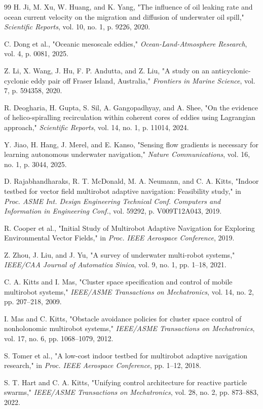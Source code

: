 \documentclass[lettersize,journal]{IEEEtran}
\begin{document}
\begin{thebibliography}{99}
 H. Ji, M. Xu, W. Huang, and K. Yang, "The influence of oil leaking rate and ocean current velocity on the migration and diffusion of underwater oil spill," \textit{Scientific Reports}, vol. 10, no. 1, p. 9226, 2020.

 C. Dong et al., "Oceanic mesoscale eddies," \textit{Ocean-Land-Atmosphere Research}, vol. 4, p. 0081, 2025.

 Z. Li, X. Wang, J. Hu, F. P. Andutta, and Z. Liu, "A study on an anticyclonic-cyclonic eddy pair off Fraser Island, Australia," \textit{Frontiers in Marine Science}, vol. 7, p. 594358, 2020.

 R. Deogharia, H. Gupta, S. Sil, A. Gangopadhyay, and A. Shee, "On the evidence of helico-spiralling recirculation within coherent cores of eddies using Lagrangian approach," \textit{Scientific Reports}, vol. 14, no. 1, p. 11014, 2024.

 Y. Jiao, H. Hang, J. Merel, and E. Kanso, "Sensing flow gradients is necessary for learning autonomous underwater navigation," \textit{Nature Communications}, vol. 16, no. 1, p. 3044, 2025.

 D. Rajabhandharaks, R. T. McDonald, M. A. Neumann, and C. A. Kitts, "Indoor testbed for vector field multirobot adaptive navigation: Feasibility study," in \textit{Proc. ASME Int. Design Engineering Technical Conf. Computers and Information in Engineering Conf.}, vol. 59292, p. V009T12A043, 2019.

 R. Cooper et al., "Initial Study of Multirobot Adaptive Navigation for Exploring Environmental Vector Fields," in \textit{Proc. IEEE Aerospace Conference}, 2019.

 Z. Zhou, J. Liu, and J. Yu, "A survey of underwater multi-robot systems," \textit{IEEE/CAA Journal of Automatica Sinica}, vol. 9, no. 1, pp. 1--18, 2021.

 C. A. Kitts and I. Mas, "Cluster space specification and control of mobile multirobot systems," \textit{IEEE/ASME Transactions on Mechatronics}, vol. 14, no. 2, pp. 207--218, 2009.

 I. Mas and C. Kitts, "Obstacle avoidance policies for cluster space control of nonholonomic multirobot systems," \textit{IEEE/ASME Transactions on Mechatronics}, vol. 17, no. 6, pp. 1068--1079, 2012.

 S. Tomer et al., "A low-cost indoor testbed for multirobot adaptive navigation research," in \textit{Proc. IEEE Aerospace Conference}, pp. 1--12, 2018.

 S. T. Hart and C. A. Kitts, "Unifying control architecture for reactive particle swarms," \textit{IEEE/ASME Transactions on Mechatronics}, vol. 28, no. 2, pp. 873--883, 2022.


\end{thebibliography}
\end{document}
